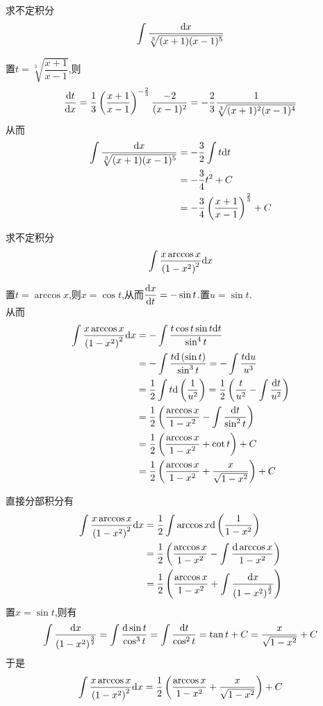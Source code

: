 \documentclass{ctexart}
\begin{document}
\begin{problem}[Problem 3.]
    求不定积分$$\int{\dfrac{\mathrm{d}x}{\sqrt[3]{(x+1)(x-1)^5}}}$$
\end{problem}
\begin{solution}[Solution.]
    置$t=\sqrt[3]{\dfrac{x+1}{x-1}}$,则
    $$\dfrac{\mathrm{d} t}{\mathrm{d} x}=\dfrac{1}{3}\left(\dfrac{x+1}{x-1}\right)^{-\frac{2}{3}}\dfrac{-2}{(x-1)^2}=-\dfrac{2}{3}\dfrac{1}{\sqrt[3]{(x+1)^2(x-1)^4}}$$
    从而
    $$\begin{aligned}
        \int{\dfrac{\mathrm{d}x}{\sqrt[3]{(x+1)(x-1)^5}}}
        &= -\dfrac{3}{2}\int t\mathrm{d} t \\
        &= -\dfrac{3}{4}t^2+C \\
        &= -\dfrac{3}{4}\left(\dfrac{x+1}{x-1}\right)^{\frac{2}{3}}+C
    \end{aligned}$$
\end{solution}
\begin{problem}[Problem 4.]
    求不定积分$$\int\dfrac{x\arccos x}{\left(1-x^2\right)^2}\mathrm{d} x$$
\end{problem}
\begin{solution}
    置$t=\arccos x$,则$x=\cos t$,从而$\dfrac{\mathrm{d} x}{\mathrm{d} t}=-\sin t$.置$u=\sin t$.\\
    从而
    $$\begin{aligned}
        \int\dfrac{x\arccos x}{\left(1-x^2\right)^2}\mathrm{d} x
        &= -\int{\dfrac{t\cos t\sin t\mathrm{d}t}{\sin^4t}} \\
        &= -\int{\dfrac{t\mathrm{d}\left(\sin t\right)}{\sin^3t}}
        = -\int{\dfrac{t\mathrm{d}u}{u^3}} \\
        &= \dfrac{1}{2}\int{t\mathrm{d}\left(\dfrac{1}{u^2}\right)}
        = \dfrac{1}{2}\left(\dfrac{t}{u^2}-\int{\dfrac{\mathrm{d}t}{u^2}}\right) \\
        &= \dfrac{1}{2}\left(\dfrac{\arccos x}{1-x^2}-\int{\dfrac{\mathrm{d}t}{\sin^2 t}}\right) \\
        &= \dfrac{1}{2}\left(\dfrac{\arccos x}{1-x^2}+\cot t\right)+C \\
        &= \dfrac{1}{2}\left(\dfrac{\arccos x}{1-x^2}+\dfrac{x}{\sqrt{1-x^2}}\right)+C
    \end{aligned}$$
\end{solution}
\begin{solution}
    直接分部积分有
    $$\begin{aligned}
        \int\dfrac{x\arccos x}{\left(1-x^2\right)^2}\mathrm{d} x
        &= \dfrac{1}{2}\int{\arccos{x}\mathrm{d}\left(\dfrac{1}{1-x^2}\right)} \\
        &= \dfrac{1}{2}\left(\dfrac{\arccos{x}}{1-x^2}-\int\dfrac{\mathrm{d}\arccos{x}}{1-x^2}\right) \\
        &= \dfrac{1}{2}\left(\dfrac{\arccos{x}}{1-x^2}+\int\dfrac{\mathrm{d} x}{\left(1-x^2\right)^\frac{3}{2}}\right) \\
    \end{aligned}$$
    置$x=\sin t$,则有
    $$\int\dfrac{\mathrm{d} x}{\left(1-x^2\right)^\frac{3}{2}}=\int{\dfrac{\mathrm{d}\sin t}{\cos^3t}}=\int{\dfrac{\mathrm{d}t}{\cos^2t}}=\tan t+C=\dfrac{x}{\sqrt{1-x^2}}+C$$
    于是$$\int\dfrac{x\arccos x}{\left(1-x^2\right)^2}\mathrm{d} x=\dfrac{1}{2}\left(\dfrac{\arccos x}{1-x^2}+\dfrac{x}{\sqrt{1-x^2}}\right)+C$$
\end{solution}
\end{document}
